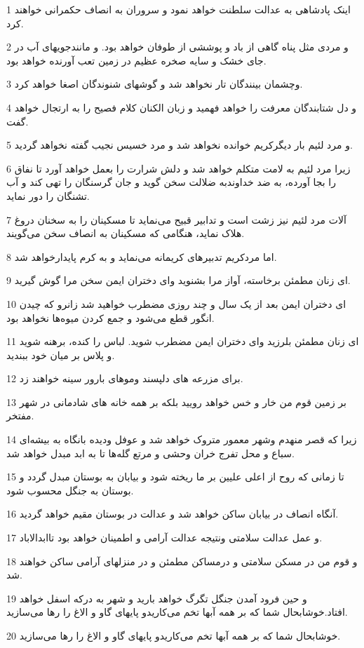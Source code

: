 \par 1 اینک پادشاهی به عدالت سلطنت خواهد نمود و سروران به انصاف حکمرانی خواهند کرد.
\par 2 و مردی مثل پناه گاهی از باد و پوششی از طوفان خواهد بود. و مانندجویهای آب در جای خشک و سایه صخره عظیم در زمین تعب آورنده خواهد بود.
\par 3 وچشمان بینندگان تار نخواهد شد و گوشهای شنوندگان اصغا خواهد کرد.
\par 4 و دل شتابندگان معرفت را خواهد فهمید و زبان الکنان کلام فصیح را به ارتجال خواهد گفت.
\par 5 و مرد لئیم بار دیگرکریم خوانده نخواهد شد و مرد خسیس نجیب گفته نخواهد گردید.
\par 6 زیرا مرد لئیم به لامت متکلم خواهد شد و دلش شرارت را بعمل خواهد آورد تا نفاق را بجا آورده، به ضد خداوندبه ضلالت سخن گوید و جان گرسنگان را تهی کند و آب تشنگان را دور نماید.
\par 7 آلات مرد لئیم نیز زشت است و تدابیر قبیح می‌نماید تا مسکینان را به سخنان دروغ هلاک نماید، هنگامی که مسکینان به انصاف سخن می‌گویند.
\par 8 اما مردکریم تدبیرهای کریمانه می‌نماید و به کرم پایدارخواهد شد.
\par 9 ‌ای زنان مطمئن برخاسته، آواز مرا بشنوید وای دختران ایمن سخن مرا گوش گیرید.
\par 10 ‌ای دختران ایمن بعد از یک سال و چند روزی مضطرب خواهید شد زانرو که چیدن انگور قطع می‌شود و جمع کردن میوه‌ها نخواهد بود.
\par 11 ‌ای زنان مطمئن بلرزید و‌ای دختران ایمن مضطرب شوید. لباس را کنده، برهنه شوید و پلاس بر میان خود ببندید.
\par 12 برای مزرعه های دلپسند وموهای بارور سینه خواهند زد.
\par 13 بر زمین قوم من خار و خس خواهد رویید بلکه بر همه خانه های شادمانی در شهر مفتخر.
\par 14 زیرا که قصر منهدم وشهر معمور متروک خواهد شد و عوفل ودیده بانگاه به بیشه‌ای سباع و محل تفرج خران وحشی و مرتع گله‌ها تا به ابد مبدل خواهد شد.
\par 15 تا زمانی که روح از اعلی علیین بر ما ریخته شود و بیابان به بوستان مبدل گردد و بوستان به جنگل محسوب شود.
\par 16 آنگاه انصاف در بیابان ساکن خواهد شد و عدالت در بوستان مقیم خواهد گردید.
\par 17 و عمل عدالت سلامتی ونتیجه عدالت آرامی و اطمینان خواهد بود تاابدالاباد.
\par 18 و قوم من در مسکن سلامتی و درمساکن مطمئن و در منزلهای آرامی ساکن خواهند شد.
\par 19 و حین فرود آمدن جنگل تگرگ خواهد بارید و شهر به درکه اسفل خواهد افتاد.خوشابحال شما که بر همه آبها تخم می‌کاریدو پایهای گاو و الاغ را رها می‌سازید.
\par 20 خوشابحال شما که بر همه آبها تخم می‌کاریدو پایهای گاو و الاغ را رها می‌سازید.
 
